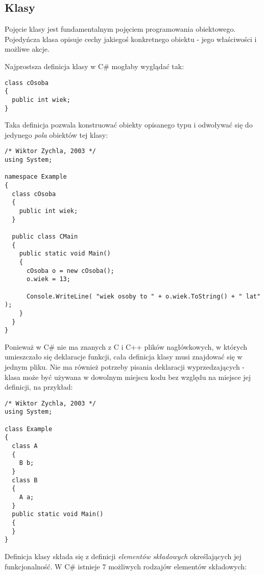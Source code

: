 ﻿\subsection{Klasy}
\label{subsubsection:klasy}

Pojęcie klasy jest fundamentalnym pojęciem programowania obiektowego. Pojedyńcza klasa opisuje cechy 
jakiegoś konkretnego obiektu - jego właściwości i możliwe akcje. 

Najprostsza definicja klasy w C\# mogłaby wyglądać tak:

\begin{scriptsize}
\begin{verbatim}
class cOsoba
{
  public int wiek; 
}
\end{verbatim}
\end{scriptsize}

Taka definicja pozwala konstruować obiekty opisanego typu i odwoływać się do jedynego {\em 
pola} obiektów tej klasy:

\begin{scriptsize}
\begin{verbatim}
/* Wiktor Zychla, 2003 */
using System;

namespace Example
{
  class cOsoba 
  {
    public int wiek; 
  } 

  public class CMain
  {
    public static void Main()
    {
      cOsoba o = new cOsoba();
      o.wiek = 13;

      Console.WriteLine( "wiek osoby to " + o.wiek.ToString() + " lat" );
    }
  }
}
\end{verbatim}
\end{scriptsize}

Ponieważ w C\# nie ma znanych z C i C++ plików nagłówkowych, w których umieszczało się deklaracje funkcji,
cała definicja klasy musi znajdować się w jednym pliku. Nie ma również potrzeby pisania deklaracji
wyprzedzających - klasa może być używana w dowolnym miejscu kodu bez względu na miejsce jej definicji, na przykład:

\begin{scriptsize}
\begin{verbatim}
/* Wiktor Zychla, 2003 */
using System;

class Example
{
  class A
  {
    B b;
  }
  class B
  {
    A a;
  }
  public static void Main()
  {
  }
}
\end{verbatim}
\end{scriptsize}

Definicja klasy składa się z definicji {\em elementów składowych} 
określających jej funkcjonalność. W C\# istnieje 7 możliwych
rodzajów elementów składowych:


